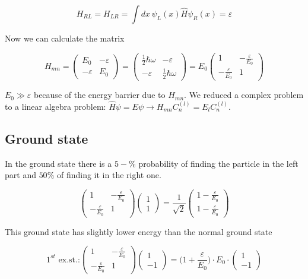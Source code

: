 $$H_{RL}=H_{LR}=\int dx\,\psi_L(x)\hat{H}\psi_R(x) = \varepsilon$$

Now we can calculate the matrix

$$H_{mn}=\begin{pmatrix}E_0 & -\varepsilon\\-\varepsilon & E_0\end{pmatrix}=\begin{pmatrix}\frac{1}{2}\hbar\omega & -\varepsilon\\-\varepsilon & \frac{1}{2}\hbar\omega\end{pmatrix}=E_0\begin{pmatrix}1 & -\frac{\varepsilon}{E_0}\\-\frac{\varepsilon}{E_0} & 1\end{pmatrix}$$

$E_0\gg \varepsilon$ because of the energy barrier due to $H_{mn}$.
We reduced a complex problem to a linear algebra problem: $\hat{H}\psi=E\psi \rightarrow H_{mn}C_n^{(l)}=E_lC_n^{(l)}$.

	\subsection{Ground state}
	In the ground state there is a $5-\%$ probability of finding the particle in the left part and $50\%$ of finding it in the right one.

$$\begin{pmatrix}1 & -\frac{\varepsilon}{E_0}\\-\frac{\varepsilon}{E_0} & 1\end{pmatrix}\begin{pmatrix}1\\1\end{pmatrix}=\frac{1}{\sqrt{2}}\begin{pmatrix}1-\frac{\varepsilon}{E_0}\\1-\frac{\varepsilon}{E_0}\end{pmatrix}$$

This ground state has slightly lower energy than the normal ground state

$$1^{st}\text{ ex.st.:}\begin{pmatrix}1 & -\frac{\varepsilon}{E_0}\\-\frac{\varepsilon}{E_0} & 1\end{pmatrix}\begin{pmatrix}1\\-1\end{pmatrix}=\biggl(1+\frac{\varepsilon}{E_0}\biggr)\cdot E_0 \cdot\begin{pmatrix}1\\-1\end{pmatrix}$$


